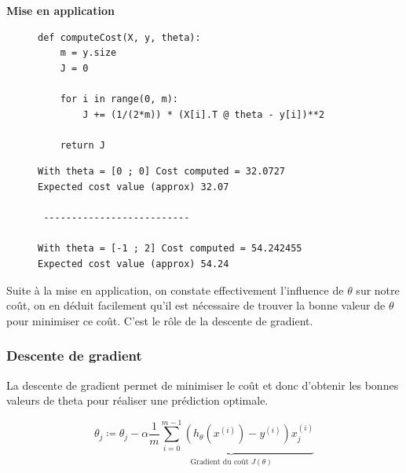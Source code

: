 \vspace{.5cm}
\noindent
\textbf{Mise en application}
\vspace{.2cm}


\begin{figure}[!h]
    \begin{minipage}{.48\linewidth}
\begin{verbatim}
def computeCost(X, y, theta):  
    m = y.size
    J = 0

    for i in range(0, m):
        J += (1/(2*m)) * (X[i].T @ theta - y[i])**2

    return J
\end{verbatim}   
    \end{minipage}\hfill
    \begin{minipage}{.48\linewidth}
\begin{verbatim}
With theta = [0 ; 0] Cost computed = 32.0727 
Expected cost value (approx) 32.07

 -------------------------- 

With theta = [-1 ; 2] Cost computed = 54.242455
Expected cost value (approx) 54.24
\end{verbatim}   
    \end{minipage}
\end{figure}

Suite à la mise en application, on constate effectivement l'influence de $\theta$ sur notre coût, on en déduit facilement qu'il est nécessaire de trouver la bonne valeur de $\theta$ pour minimiser ce coût. C'est le rôle de la descente de gradient.





\subsubsection{Descente de gradient}

La descente de gradient permet de minimiser le coût et donc d'obtenir les bonnes valeurs de theta pour réaliser une prédiction optimale.

\begin{equation}\label{eq:cout}
    \theta_j \coloneqq \theta_j - \alpha \underbrace{\frac{1}{m} \sum_{i=0}^{m-1} (h_\theta(x^{(i)}) - y^{(i)}) x_j^{(i)}}_{\text{Gradient du coût $J(\theta)$}}
 \end{equation}

